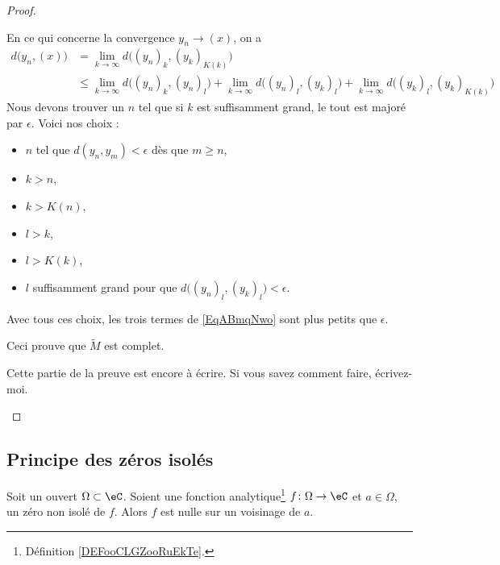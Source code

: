 \begin{proof}
\begin{subproof}
\begin{subproof}
			En ce qui concerne la convergence \( y_n\to (x)\), on a
			\begin{subequations}
				\begin{align}
					d\big( y_n,(x) \big) & =\lim_{k\to \infty} d\big( (y_n)_k,(y_k)_{K(k)} \big)                                                                                                                            \\
					                     & \leq \lim_{k\to \infty} d\big( (y_n)_k,(y_n)_l \big)+\lim_{k\to \infty} d\big( (y_n)_l,(y_k)_{l} \big)+\lim_{k\to \infty} d\big( (y_k)_l,(y_k)_{K(k)} \big)    \label{EqABmqNwo}
				\end{align}
			\end{subequations}
			Nous devons trouver un \( n\) tel que si \( k\) est suffisamment grand, le tout est majoré par \( \epsilon\). Voici nos choix :
			\begin{itemize}
				\item \( n\) tel que \( d(y_n,y_m)<\epsilon\) dès que \( m\geq n\),
				\item \( k>n\),
				\item \( k>K(n)\),
				\item \( l>k\),
				\item \( l>K(k)\),
				\item \( l\) suffisamment grand pour que \( d\big( (y_n)_l,(y_k)_l \big)<\epsilon\).
			\end{itemize}
			Avec tous ces choix, les trois termes de \eqref{EqABmqNwo} sont plus petits que \( \epsilon\).

			Ceci prouve que \( \tilde M\) est complet.
		\end{subproof}
		\item[Unicité]
		Cette partie de la preuve est encore à écrire. Si vous savez comment faire, écrivez-moi.
	\end{subproof}
\end{proof}

\subsection{Principe des zéros isolés}

\begin{theorem}     \label{ThoukDPBX}
	Soit un ouvert \( \Omega\subset \eC\). Soient une fonction analytique\footnote{Définition \ref{DEFooCLGZooRuEkTe}.} \(f\colon \Omega\to \eC \) et \( a\in \Omega\), un zéro non isolé de \( f\). Alors \( f\) est nulle sur un voisinage de \( a\).
\end{theorem}


